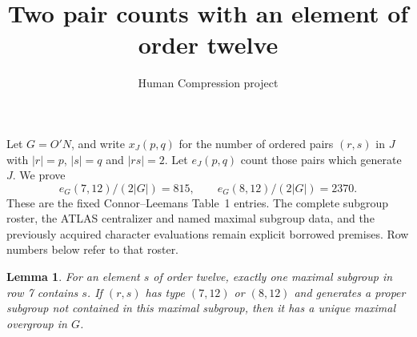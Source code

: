 \documentclass[11pt,a4paper]{article}
\title{Two pair counts with an element of order twelve}
\author{Human Compression project}\date{}
\newtheorem{lemma}{Lemma}\newtheorem{theorem}{Theorem}
\begin{document}
\maketitle
Let $G=O'N$, and write $x_J(p,q)$ for the number of ordered pairs
$(r,s)$ in $J$ with $|r|=p$, $|s|=q$ and $|rs|=2$. Let $e_J(p,q)$
count those pairs which generate $J$. We prove
\[
       e_G(7,12)/(2|G|)=815,\qquad e_G(8,12)/(2|G|)=2370.       \tag{1}
\]
These are the fixed Connor--Leemans Table~1 entries. The complete subgroup
roster, the ATLAS centralizer and named maximal subgroup data, and the
previously acquired character evaluations remain explicit borrowed
premises. Row numbers below refer to that roster.

\begin{lemma}
For an element $s$ of order twelve, exactly one maximal subgroup in
row 7 contains $s$. If $(r,s)$ has type $(7,12)$ or $(8,12)$ and generates
a proper subgroup not contained in this maximal subgroup, then it
has a unique maximal overgroup in $G$.
\end{lemma}
\end{document}
